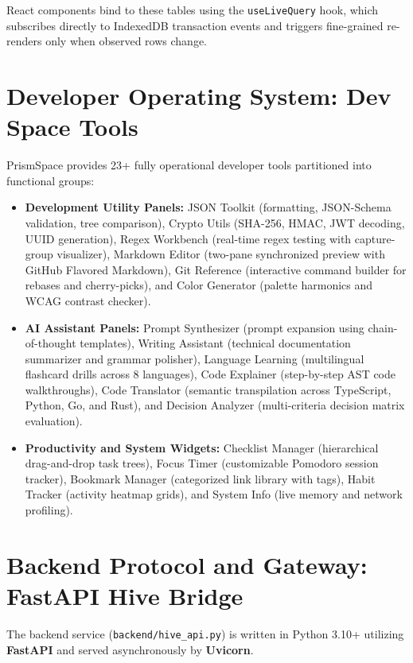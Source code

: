 \documentclass[12pt,a4paper]{report}
\begin{document}
React components bind to these tables using the \texttt{useLiveQuery} hook, which subscribes directly to IndexedDB transaction events and triggers fine-grained re-renders only when observed rows change.

\section{Developer Operating System: Dev Space Tools}
PrismSpace provides 23+ fully operational developer tools partitioned into functional groups:
\begin{itemize}
    \item \textbf{Development Utility Panels:} JSON Toolkit (formatting, JSON-Schema validation, tree comparison), Crypto Utils (SHA-256, HMAC, JWT decoding, UUID generation), Regex Workbench (real-time regex testing with capture-group visualizer), Markdown Editor (two-pane synchronized preview with GitHub Flavored Markdown), Git Reference (interactive command builder for rebases and cherry-picks), and Color Generator (palette harmonics and WCAG contrast checker).
    \item \textbf{AI Assistant Panels:} Prompt Synthesizer (prompt expansion using chain-of-thought templates), Writing Assistant (technical documentation summarizer and grammar polisher), Language Learning (multilingual flashcard drills across 8 languages), Code Explainer (step-by-step AST code walkthroughs), Code Translator (semantic transpilation across TypeScript, Python, Go, and Rust), and Decision Analyzer (multi-criteria decision matrix evaluation).
    \item \textbf{Productivity and System Widgets:} Checklist Manager (hierarchical drag-and-drop task trees), Focus Timer (customizable Pomodoro session tracker), Bookmark Manager (categorized link library with tags), Habit Tracker (activity heatmap grids), and System Info (live memory and network profiling).
\end{itemize}

\section{Backend Protocol and Gateway: FastAPI Hive Bridge}
The backend service (\texttt{backend/hive\_api.py}) is written in Python 3.10+ utilizing \textbf{FastAPI} and served asynchronously by \textbf{Uvicorn}.
\end{document}
